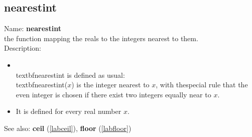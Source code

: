 \subsection{nearestint}
\label{labnearestint}
\noindent Name: \textbf{nearestint}\\
the function mapping the reals to the integers nearest to them.\\
\noindent Description: \begin{itemize}

\item \\textbf{nearestint} is defined as usual: \\textbf{nearestint}($x$) is the integer nearest to $x$, with the\n   special rule that the even integer is chosen if there exist two integers equally near to $x$.\n
\item It is defined for every real number $x$.\n\end{itemize}
See also: \textbf{ceil} (\ref{labceil}), \textbf{floor} (\ref{labfloor})
